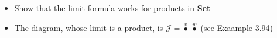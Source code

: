\begin{itemize}
    \item  Show that the \href{doc/1 math/Seven Sketches in Compositionality/Chapter 3: Databases/5 Introduction to limits and colimits/3 Finite limits in Set/1 Limit formula}{limit formula} works for products in \textbf{Set}
    \item The diagram, whose limit is a product, is $\mathcal{J}=\boxed{\overset{v}\bullet\ \overset{w}\bullet}$ (see \href{doc/1 math/Seven Sketches in Compositionality/Chapter 3: Databases/5 Introduction to limits and colimits/2 Limits/3 Product as limit}{Exaample 3.94})
  \end{itemize}